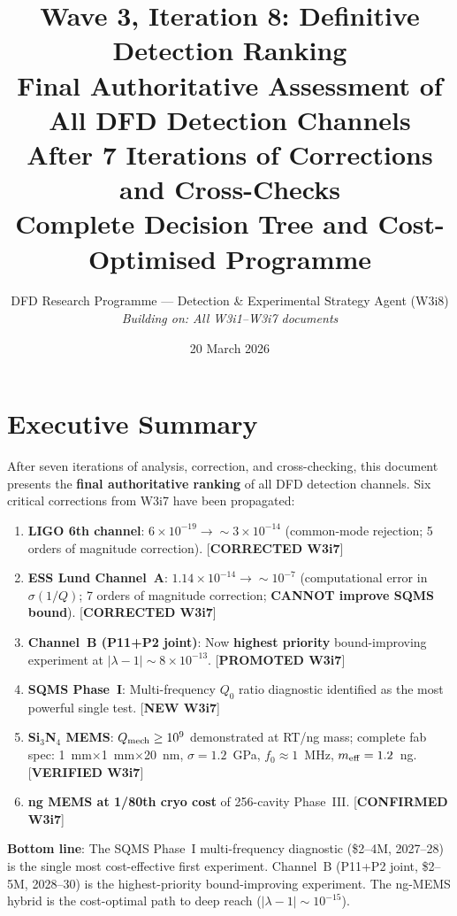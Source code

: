 \documentclass[11pt]{article}
\title{Wave 3, Iteration 8: Definitive Detection Ranking\\
\large Final Authoritative Assessment of All DFD Detection Channels\\
After 7 Iterations of Corrections and Cross-Checks\\
Complete Decision Tree and Cost-Optimised Programme}
\author{DFD Research Programme --- Detection \& Experimental Strategy Agent (W3i8)\\
\textit{Building on: All W3i1--W3i7 documents}}
\date{20 March 2026}
\newcommand{\lam}{\lambda}
\newcommand{\ee}[1]{\times 10^{#1}}
\newcommand{\Qmech}{Q_{\rm mech}}
\newcommand{\lbone}{|\lam - 1|}
\theoremstyle{definition}
\theoremstyle{remark}
\begin{document}
\maketitle
\tableofcontents
\newpage

\section*{Executive Summary}

\begin{tcolorbox}[colback=blue!5!white, colframe=blue!60!black,
  title=\textbf{W3i8 --- THE DEFINITIVE DETECTION RANKING}]

After seven iterations of analysis, correction, and cross-checking,
this document presents the \textbf{final authoritative ranking} of all
DFD detection channels. Six critical corrections from W3i7 have been
propagated:

\begin{enumerate}[nosep]
\item \textbf{LIGO 6th channel}: $6\ee{-19} \to \sim 3\ee{-14}$
  (common-mode rejection; 5 orders of magnitude correction). [\textbf{CORRECTED W3i7}]
\item \textbf{ESS Lund Channel~A}: $1.14\ee{-14} \to \sim 10^{-7}$
  (computational error in $\sigma(1/Q)$; 7 orders of magnitude correction;
  \textbf{CANNOT improve SQMS bound}). [\textbf{CORRECTED W3i7}]
\item \textbf{Channel~B (P11+P2 joint)}: Now \textbf{highest priority}
  bound-improving experiment at $\lbone \sim 8\ee{-13}$. [\textbf{PROMOTED W3i7}]
\item \textbf{SQMS Phase~I}: Multi-frequency $Q_0$ ratio diagnostic
  identified as the most powerful single test. [\textbf{NEW W3i7}]
\item \textbf{Si$_3$N$_4$ MEMS}: $\Qmech \geq 10^9$ demonstrated at
  RT/ng mass; complete fab spec: 1~mm$\times$1~mm$\times$20~nm,
  $\sigma = 1.2$~GPa, $f_0 \approx 1$~MHz, $m_{\rm eff} = 1.2$~ng.
  [\textbf{VERIFIED W3i7}]
\item \textbf{ng MEMS at 1/80th cryo cost} of 256-cavity Phase~III.
  [\textbf{CONFIRMED W3i7}]
\end{enumerate}

\textbf{Bottom line}: The SQMS Phase~I multi-frequency diagnostic
(\$2--4M, 2027--28) is the single most cost-effective first experiment.
Channel~B (P11+P2 joint, \$2--5M, 2028--30) is the highest-priority
bound-improving experiment. The ng-MEMS hybrid is the cost-optimal path
to deep reach ($\lbone \sim 10^{-15}$).
\end{tcolorbox}
\end{document}
